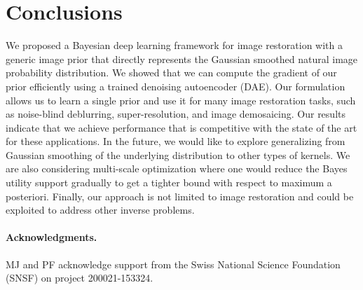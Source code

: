 \documentclass{article}
\begin{document}
\section{Conclusions}

We proposed a Bayesian deep learning framework for image restoration with a generic image prior that directly represents the Gaussian smoothed natural image probability distribution.
We showed that we can compute the gradient of our prior efficiently using a trained denoising autoencoder (DAE).
Our formulation allows us to learn a single prior and use it for many image restoration tasks, such as noise-blind deblurring, super-resolution, and image demosaicing.
Our results indicate that we achieve performance that is competitive with the state of the art for these applications.
In the future, we would like to explore generalizing from Gaussian smoothing of the underlying distribution to other types of kernels.
We are also considering multi-scale optimization where one would reduce the Bayes utility support gradually to get a tighter bound with respect to maximum a posteriori.
Finally, our approach is not limited to image restoration and could be exploited to address other inverse problems.
\paragraph{Acknowledgments.}
MJ and PF acknowledge support from the Swiss National Science Foundation (SNSF) on project 200021-153324.


{\small


}
\end{document}
